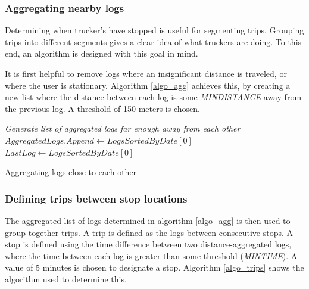 \subsubsection{Aggregating nearby logs}
Determining when trucker's have stopped is useful for segmenting trips.
Grouping trips into different segments gives a clear idea of what truckers are doing.
To this end, an algorithm is designed with this goal in mind.

It is first helpful to remove logs where an insignificant distance is traveled, or where the user is stationary.
Algorithm \ref{algo_agg} achieves this, by creating a new list where the distance between each log is some \textit{MINDISTANCE} away from the previous log. A threshold of 150 meters is chosen.


\begin{algorithm}

\BlankLine
\emph{Generate list of aggregated logs far enough away from each other}\;
$AggregatedLogs.Append \gets LogsSortedByDate[0]$\;
$LastLog \gets LogsSortedByDate[0]$\;
\caption{Aggregating logs close to each other}\label{algo_agg}
\end{algorithm}\DecMargin{1em} 

\subsubsection{Defining trips between stop locations}
The aggregated list of logs determined in algorithm \ref{algo_agg} is then used to group together trips.
A trip is defined as the logs between consecutive stops.
A stop is defined using the time difference between two distance-aggregated logs, where the time between each log is greater than some threshold (\textit{MINTIME}).
A value of 5 minutes is chosen to designate a stop.
Algorithm \ref{algo_trips} shows the algorithm used to determine this.

